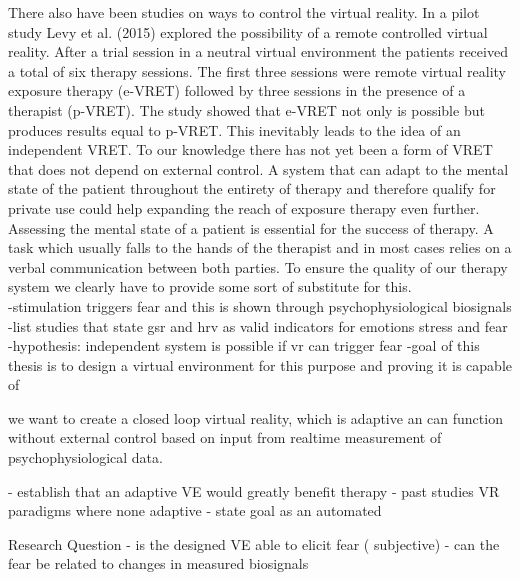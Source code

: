 There also have been studies on ways to control the virtual reality. In a pilot study Levy et al. (2015) explored the possibility of a remote controlled virtual reality. After a trial session in a neutral virtual environment the patients received a total of six therapy sessions. The first three sessions were remote virtual reality exposure therapy (e-VRET) followed by three sessions in the presence of a therapist (p-VRET). The study showed that e-VRET not only is possible but produces results equal to p-VRET. This inevitably leads to the idea of an independent VRET. To our knowledge there has not yet been a form of VRET that does not depend on external control. A system that can adapt to the mental state of the patient throughout the entirety of therapy and therefore qualify for private use could help expanding the reach of exposure therapy even further.
Assessing the mental state of a patient is essential for the success of therapy. A task which usually falls to the hands of the therapist and in most cases relies on a verbal communication between both parties.
To ensure the quality of our therapy system we clearly have to provide some sort of substitute for this.\\
-stimulation triggers fear and this is shown through psychophysiological biosignals\\
-list studies that state gsr and hrv as valid indicators for emotions stress and fear\\
-hypothesis: independent system is possible if vr can trigger fear
-goal of this thesis is to design a virtual environment for this purpose and proving it is capable of 



we want to create a closed loop virtual reality, which is adaptive an can function without external control based on input from realtime measurement of psychophysiological data.

- establish that an adaptive VE would greatly benefit therapy
- past studies VR paradigms where none adaptive
- state goal as an automated 




Research Question
- is the designed VE able to elicit fear ( subjective)
- can the fear be related to changes in measured biosignals






